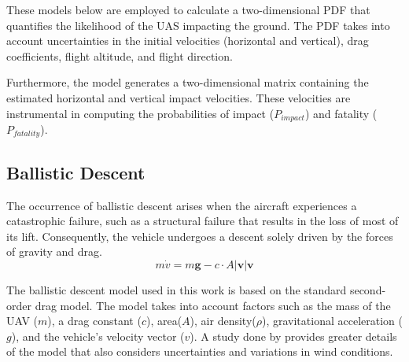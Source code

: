 \documentclass[12pt]{report}
\begin{document}
        These models below are employed to calculate a two-dimensional PDF that quantifies the likelihood of the UAS
        impacting the ground. The PDF takes into account uncertainties in the initial velocities (horizontal and
        vertical), drag coefficients, flight altitude, and flight direction. 
            
        Furthermore, the model generates a two-dimensional matrix containing the estimated horizontal and vertical
        impact velocities. These velocities are instrumental in computing the probabilities of impact (\(P_{impact}\))
        and fatality (\(P_{fatality}\)).

        \subsection{Ballistic Descent}
        The occurrence of ballistic descent arises when the aircraft experiences a catastrophic failure, such as a
        structural failure that results in the loss of most of its lift. Consequently, the vehicle undergoes a descent
        solely driven by the forces of gravity and drag.
        \begin{equation}
             m\dot{v} = m \mathbf{g} - c \cdot A \lvert \mathbf{v} \rvert \mathbf{v}
        \end{equation}
        
        The ballistic descent model used in this work is based on the standard second-order drag model. The model takes
        into account factors such as the mass of the UAV (\(m\)), a drag constant (\(c\)), area(\(A\)), air
        density(\(\rho\)), gravitational acceleration (\(g\)), and the vehicle's velocity vector (\(v\)). A study done by
        \cite{cour-harbo_ground_2020} provides greater details of the model that also considers uncertainties and variations in wind conditions.
\end{document}
